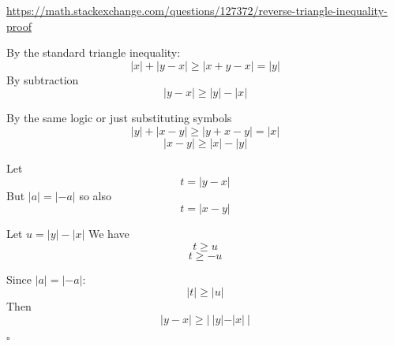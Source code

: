\documentclass[11pt, oneside]{article}
\begin{document}
\url{https://math.stackexchange.com/questions/127372/reverse-triangle-inequality-proof}

By the standard triangle inequality:
\[ |x| + |y-x| \ge |x + y - x| = |y| \]
By subtraction
\[ |y-x| \ge |y| - |x| \]

By the same logic or just substituting symbols
\[ |y| + |x-y| \ge |y + x - y| = |x| \]
\[ |x-y| \ge |x| - |y| \]

Let 
\[ t = |y-x|  \]
But $|a| = |-a|$ so also
\[ t = |x-y|  \]

Let $u = |y| - |x|$  We have
\[ t \ge u \]
\[ t \ge -u \]

Since $|a| = |-a|$:
\[ |t| \ge |u| \]
Then
\[ |y-x| \ge | \ |y| - |x| \ | \]

$\square$
\end{document}
